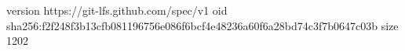 version https://git-lfs.github.com/spec/v1
oid sha256:f2f248f3b13cfb081196756e086f6bcf4e48236a60f6a28bd74c3f7b0647c03b
size 1202
